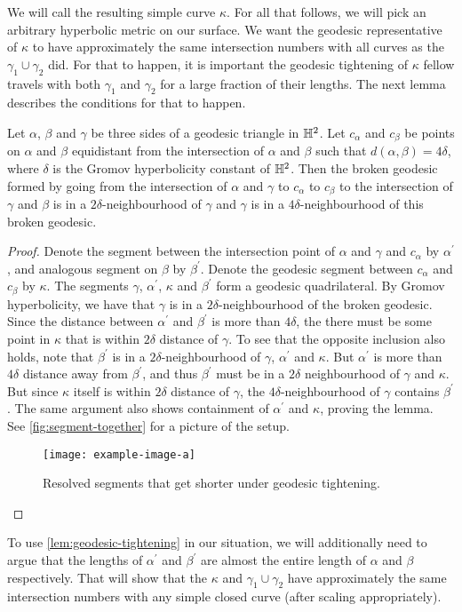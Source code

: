 \documentclass[12pt, reqno]{amsart}
\begin{document}
We will call the resulting simple curve $\kappa$.
For all that follows, we will pick an arbitrary hyperbolic metric on our surface.
We want the geodesic representative of $\kappa$ to have approximately the same intersection numbers with all curves as the $\gamma_1 \cup \gamma_2$ did.
For that to happen, it is important the geodesic tightening of $\kappa$ fellow travels with both $\gamma_1$ and $\gamma_2$ for a large fraction of their lengths.
The next lemma describes the conditions for that to happen.
\begin{lemma}
  \label{lem:geodesic-tightening}
  Let $\alpha$, $\beta$ and $\gamma$ be three sides of a geodesic triangle in $\mathbb{H}^2$.
  Let $c_\alpha$ and $c_{\beta}$ be points on $\alpha$ and $\beta$ equidistant from the intersection of $\alpha$ and $\beta$ such that $d(\alpha, \beta) = 4 \delta$, where $\delta$ is the Gromov hyperbolicity constant of $\mathbb{H}^2$.
  Then the broken geodesic formed by going from the intersection of $\alpha$ and $\gamma$ to $c_{\alpha}$ to $c_{\beta}$ to the intersection of $\gamma$ and $\beta$ is in a $2\delta$-neighbourhood of $\gamma$ and $\gamma$ is in a $4\delta$-neighbourhood of this broken geodesic.
\end{lemma}
\begin{proof}
  Denote the segment between the intersection point of $\alpha$ and $\gamma$ and $c_{\alpha}$ by $\alpha^{\prime}$, and analogous segment on $\beta$ by $\beta^{\prime}$.
  Denote the geodesic segment between $c_{\alpha}$ and $c_{\beta}$ by $\kappa$.
  The segments $\gamma$, $\alpha^{\prime}$, $\kappa$ and $\beta^{\prime}$ form a geodesic quadrilateral.
  By Gromov hyperbolicity, we have that $\gamma$ is in a $2\delta$-neighbourhood of the broken geodesic.
  Since the distance between $\alpha^{\prime}$ and $\beta^{\prime}$ is more than $4 \delta$, the there must be some point in $\kappa$ that is within $2 \delta$ distance of $\gamma$.
  To see that the opposite inclusion also holds, note that $\beta^{\prime}$ is in a $2\delta$-neighbourhood of $\gamma$, $\alpha^{\prime}$ and $\kappa$.
  But $\alpha^{\prime}$ is more than $4 \delta$ distance away from $\beta^{\prime}$, and thus $\beta^{\prime}$ must be in a $2\delta$ neighbourhood of $\gamma$ and $\kappa$.
  But since $\kappa$ itself is within $2\delta$ distance of $\gamma$, the $4\delta$-neighbourhood of $\gamma$ contains $\beta^{\prime}$.
  The same argument also shows containment of $\alpha^{\prime}$ and $\kappa$, proving the lemma.
  See \autoref{fig:segment-together} for a picture of the setup.
  \begin{figure}[h]
    \centering
    \texttt{[image: example-image-a]}
    \caption{Resolved segments that get shorter under geodesic tightening.}
    \label{fig:segment-together}
  \end{figure}
\end{proof}
To use \autoref{lem:geodesic-tightening} in our situation, we will additionally need to argue that the lengths of $\alpha^{\prime}$ and $\beta^{\prime}$ are almost the entire length of $\alpha$ and $\beta$ respectively.
That will show that the $\kappa$ and $\gamma_1 \cup \gamma_2$ have approximately the same intersection numbers with any simple closed curve (after scaling appropriately).
\end{document}
